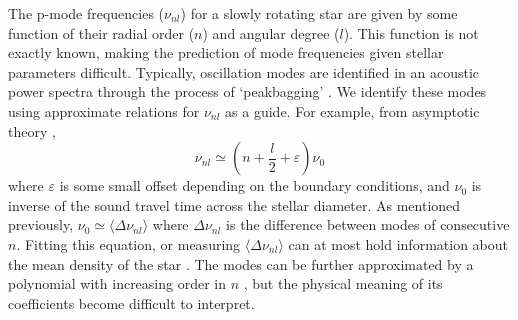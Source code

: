 The p-mode frequencies (\(\nu_{nl}\)) for a slowly rotating star are given by some function of their radial order (\(n\)) and angular degree (\(l\)). This function is not exactly known, making the prediction of mode frequencies given stellar parameters difficult. Typically, oscillation modes are identified in an acoustic power spectra through the process of `peakbagging' \citep[e.g.][]{Nielsen.Davies.ea2021}. We identify these modes using approximate relations for \(\nu_{nl}\) as a guide. For example, from asymptotic theory \citep{Tassoul1980},
%
\begin{equation}
    \nu_{nl} \simeq \left(n + \frac{l}{2} + \varepsilon\right) \nu_0\label{eq:asy}
\end{equation}
%
where \(\varepsilon\) is some small offset depending on the boundary conditions, and \(\nu_0\) is inverse of the sound travel time across the stellar diameter. As mentioned previously, \(\nu_0 \simeq \langle \Delta\nu_{nl} \rangle\) where \(\Delta\nu_{nl}\) is the difference between modes of consecutive \(n\). Fitting this equation, or measuring \(\langle \Delta\nu_{nl} \rangle\) can at most hold information about the mean density of the star \needcite. The modes can be further approximated by a polynomial with increasing order in \(n\) \citep{Ulrich1986}, but the physical meaning of its coefficients become difficult to interpret.


